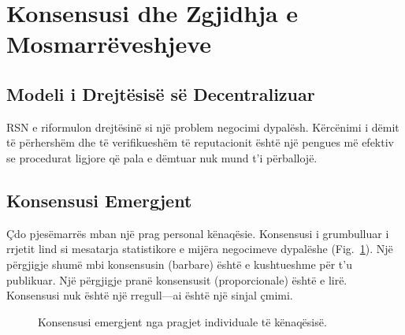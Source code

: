 \documentclass[11pt,a4paper,twocolumn]{article}
\begin{document}
\section{Konsensusi dhe Zgjidhja e Mosmarrëveshjeve}

\subsection{Modeli i Drejtësisë së Decentralizuar}

RSN e riformulon drejtësinë si një problem negocimi dypalësh. Kërcënimi i dëmit të përhershëm dhe të verifikueshëm të reputacionit është një pengues më efektiv se procedurat ligjore që pala e dëmtuar nuk mund t'i përballojë.

\subsection{Konsensusi Emergjent}

Çdo pjesëmarrës mban një prag personal kënaqësie. Konsensusi i grumbulluar i rrjetit lind si mesatarja statistikore e mijëra negocimeve dypalëshe (Fig.~\ref{fig:consensus}). Një përgjigje shumë mbi konsensusin (barbare) është e kushtueshme për t'u publikuar. Një përgjigje pranë konsensusit (proporcionale) është e lirë. Konsensusi nuk është një rregull---ai është një sinjal çmimi.

\begin{figure}[ht]
\centering
{}
\caption{Konsensusi emergjent nga pragjet individuale të kënaqësisë.}
\label{fig:consensus}
\end{figure}
\end{document}
